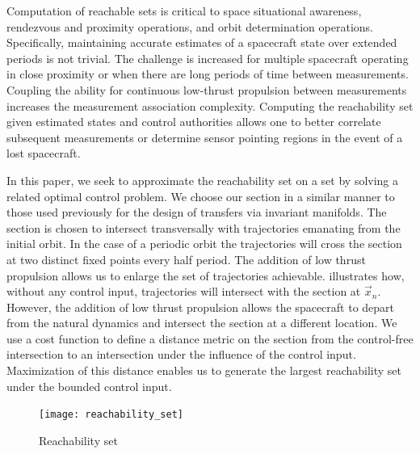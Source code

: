 \documentclass[preprint]{elsarticle}
\begin{document}
Computation of reachable sets is critical to space situational awareness, rendezvous and proximity operations, and orbit determination operations.
Specifically, maintaining accurate estimates of a spacecraft state over extended periods is not trivial.
The challenge is increased for multiple spacecraft operating in close proximity or when there are long periods of time between measurements.
Coupling the ability for continuous low-thrust propulsion between measurements increases the measurement association complexity.
Computing the reachability set given estimated states and control authorities allows one to better correlate subsequent measurements or determine sensor pointing regions in the event of a lost spacecraft. 

In this paper, we seek to approximate the reachability set on a \Poincare set by solving a related optimal control problem. 
We choose our \Poincare section in a similar manner to those used previously for the design of transfers via invariant manifolds.
The \Poincare section is chosen to intersect transversally with trajectories emanating from the initial orbit. 
In the case of a periodic orbit the trajectories will cross the \Poincare section at two distinct fixed points every half period.
The addition of low thrust propulsion allows us to enlarge the set of trajectories achievable. 
 illustrates how, without any control input, trajectories will intersect with the \Poincare section at \( \vec{x}_n \). 
However, the addition of low thrust propulsion allows the spacecraft to depart from the natural dynamics and intersect the \Poincare section at a different location.
We use a cost function to define a distance metric on the \Poincare section from the control-free intersection to an intersection under the influence of the control input.
Maximization of this distance enables us to generate the largest reachability set under the bounded control input.
\begin{figure}
	\centering
	\texttt{[image: reachability\_set]}
	\caption{Reachability set\label{fig:reachability_set}}
\end{figure}
\end{document}

